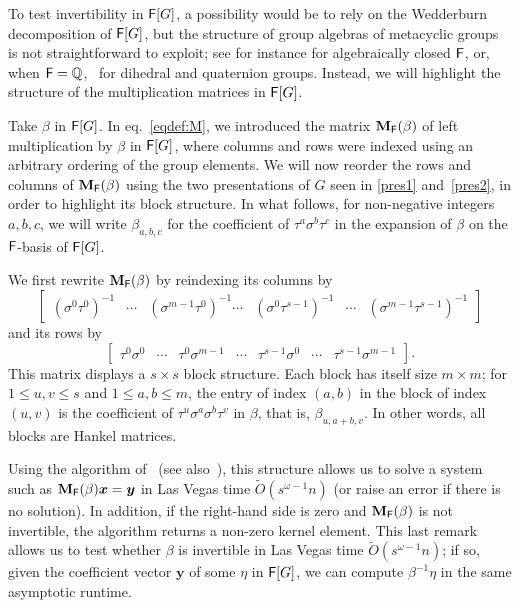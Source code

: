 To test invertibility in ${\mathsf{F}}[G]$, a possibility would be to rely on
the Wedderburn decomposition of ${\mathsf{F}}[G]$, but the structure of group
algebras of metacyclic groups is not straightforward to exploit; see
for instance \citep[\S 47]{Curtis} for algebraically closed ${\mathsf{F}}$, or,
when ${\mathsf{F}}=\mathbb{Q}$,~\citep{Decomposition} for dihedral and quaternion
groups. Instead, we will highlight the structure of the multiplication
matrices in ${\mathsf{F}}[G]$.

Take $\beta$ in ${\mathsf{F}}[G]$. In eq.~\eqref{eqdef:M}, we introduced the
matrix $\mat M_\F(\beta)$ of left multiplication by $\beta$ in
${\mathsf{F}}[G]$, where columns and rows were indexed using an arbitrary ordering
of the group elements. We will now reorder the rows and columns of
$\mat M_\F(\beta)$ using the two presentations of $G$ seen in
\eqref{pres1} and~\eqref{pres2}, in order to highlight its block structure.
In what follows, for non-negative integers $a,b,c$, we will write
$\beta_{a,b,c}$ for the coefficient of $\tau^a \sigma^b \tau^c$ in the
expansion of $\beta$ on the ${\mathsf{F}}$-basis of ${\mathsf{F}}[G]$.

We first rewrite $\mat M_\F(\beta)$ by reindexing its columns
by 
$$\begin{bmatrix}
(\sigma^0 \tau^0)^{-1} &  \cdots & (\sigma^{m-1} \tau^0)^{-1} \cdots& (\sigma^0 \tau^{s-1})^{-1} &  \cdots & (\sigma^{m-1} \tau^{s-1})^{-1} 
\end{bmatrix}$$
and its rows by
$$\begin{bmatrix}
\tau^0 \sigma^0 & \cdots & \tau^0 \sigma^{m-1} & \cdots& \tau^{s-1} \sigma^0 & \cdots&  \tau^{s-1} \sigma^{m-1}
\end{bmatrix}.
$$ This matrix displays a $s \times s$
block structure. Each block has itself size $m \times m$; for $1 \le
u,v \le s$ and $1 \le a,b \le m$, the entry of index $(a,b)$ in the
block of index $(u,v)$ is the coefficient of $\tau^u \sigma^a \sigma^b
\tau^v$ in $\beta$, that is, $\beta_{u,a+b,v}$. In other words,
all blocks are Hankel matrices.

Using the algorithm of~\cite{BoJeMoSc17} (see
also~\citealt[Appendix~A]{EbGiGiSVi07}), this structure allows us to
solve a system such as $\mat M_\F(\beta) \boldsymbol x = \boldsymbol
y$ in Las Vegas time $\tilde{O}(s^{\omega-1} n)$ (or raise an error if
there is no solution). In addition, if the right-hand side is zero and
$\mat M_\F(\beta)$ is not invertible, the algorithm returns a non-zero
kernel element.
This last remark allows us to test whether $\beta$ is invertible in
Las Vegas time $\tilde{O}(s^{\omega-1} n)$; if so, given the
coefficient vector $\boldsymbol y$ of some $\eta$ in ${\mathsf{F}}[G]$, we can
compute $\beta^{-1} \eta$ in the same asymptotic runtime.

